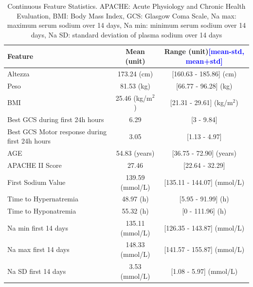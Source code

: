 \begin{table}[h!]
	\centering
	\tiny %
	\begin{tabular}{lcc}
		\hline
		\textbf{Feature} & \textbf{Mean (unit)} & \textbf{Range (unit)}\textcolor{blue}{[mean-std, mean+std]} \\ \hline
		Altezza & 173.24 (cm) & [160.63 - 185.86] (cm) \\
		Peso & 81.53 (kg) & [66.77 - 96.28] (kg) \\
		BMI & 25.46 (kg/m$^2$) & [21.31 - 29.61] (kg/m$^2$) \\
		Best GCS during first 24h hours & 6.29 & [3 - 9.84] \\
		Best GCS Motor response during first 24h hours & 3.05 & [1.13 - 4.97] \\
		
		AGE  & 54.83 (years) & [36.75 - 72.90] (years) \\
		APACHE II Score & 27.46& [22.64 - 32.29] \\
		First Sodium Value & 139.59 (mmol/L)  & [135.11 - 144.07] (mmol/L) \\
		Time to Hypernatremia & 48.97 (h)  & [5.95 - 91.99] (h) \\
		Time to Hyponatremia & 55.32 (h)  & [0 - 111.96] (h) \\
		Na min first 14 days  & 135.11 (mmol/L)  & [126.35 - 143.87] (mmol/L) \\
		Na max first 14 days  & 148.33 (mmol/L)  & [141.57 - 155.87] (mmol/L) \\
		Na SD first 14 days & 3.53 (mmol/L)  & [1.08 - 5.97] (mmol/L) \\
		\hline
	\end{tabular}
	\caption{Continuous Feature Statistics. \footnotesize{APACHE: Acute Physiology and Chronic Health Evaluation, BMI: Body Mass Index, GCS: Glasgow Coma Scale, Na max: maximum serum sodium over 14 days, Na min: minimum serum sodium over 14 days, Na SD: standard deviation of plasma sodium over 14 days}}
	\label{tab:continuous_features}
\end{table}

